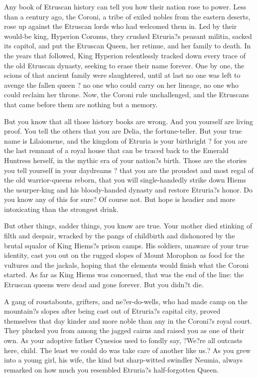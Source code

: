 \documentclass[char]{Kos}
\begin{document}
\name{\cBurglar{}}

    Any book of Etruscan history can tell you how their nation rose to power. Less than a century ago, the Coroni, a tribe of exiled nobles from the eastern deserts, rose up against the Etruscan lords who had welcomed them in. Led by their would-be king, Hyperion Coronus, they crushed Etruria?s peasant militia, sacked its capitol, and put the Etruscan Queen, her retinue, and her family to death. In the years that followed, King Hyperion relentlessly tracked down every trace of the old Etruscan dynasty, seeking to erase their name forever. One by one, the scions of that ancient family were slaughtered, until at last no one was left to avenge the fallen queen ? no one who could carry on her lineage, no one who could reclaim her throne. Now, the Coroni rule unchallenged, and the Etruscans that came before them are nothing but a memory. 

    But you know that all those history books are wrong. And you yourself are living proof. You tell the others that you are Delia, the fortune-teller. But your true name is Lilaiomene, and the kingdom of Etruria is your birthright ? for you are the last remnant of a royal house that can be traced back to the Emerald Huntress herself, in the mythic era of your nation?s birth. Those are the stories you tell yourself in your daydreams ? that you are the proudest and most regal of the old warrior-queens reborn, that you will single-handedly strike down Hiems the usurper-king and his bloody-handed dynasty and restore Etruria?s honor. Do you know any of this for sure? Of course not. But hope is headier and more intoxicating than the strongest drink.

    But other things, sadder things, you know are true. Your mother died stinking of filth and despair, wracked by the pangs of childbirth and dishonored by the brutal squalor of King Hiems?s prison camps. His soldiers, unaware of your true identity, cast you out on the rugged slopes of Mount Morophon as food for the vultures and the jackals, hoping that the elements would finish what the Coroni started. As far as King Hiems was concerned, that was the end of the line: the Etruscan queens were dead and gone forever. But you didn?t die. 

    A gang of roustabouts, grifters, and ne?er-do-wells, who had made camp on the mountain?s slopes after being cast out of Etruria?s capital city, proved themselves that day kinder and more noble than any in the Coroni?s royal court. They plucked you from among the jagged cairns and raised you as one of their own. As your adoptive father Cynesios used to fondly say, ?We?re all outcasts here, child. The least we could do was take care of another like us.? As you grew into a young girl, his wife, the kind but sharp-witted swindler Neumia, always remarked on how much you resembled Etruria?s half-forgotten Queen. 
\end{document}
